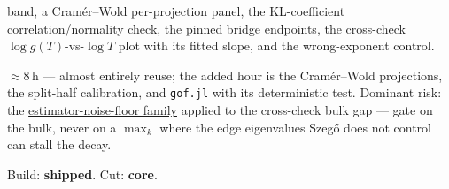 \documentclass[11pt]{article}
\newenvironment{brief}{%
  \begin{description}[style=sameline,leftmargin=2.3cm,font=\bfseries\color{hubblue}]
}{%
  \end{description}
}
\begin{document}
\begin{brief}
band, a Cram\'er--Wold per-projection panel, the KL-coefficient correlation/normality check, the
pinned bridge endpoints, the cross-check $\log g(T)$-vs-$\log T$ plot with its fitted slope, and the
wrong-exponent control.
\item[Effort \& risk] $\approx 8$\,h --- almost entirely reuse; the added hour is the Cram\'er--Wold
projections, the split-half calibration, and \texttt{gof.jl} with its deterministic test. Dominant
risk: the \hyperref[sec:risk]{estimator-noise-floor family} applied to the cross-check bulk gap ---
gate on the bulk, never on a $\max_k$ where the edge eigenvalues Szeg\H{o} does not control can stall
the decay.
\item[Status] Build: \textbf{shipped}. Cut: \textbf{core}.
\end{brief}

\end{document}
